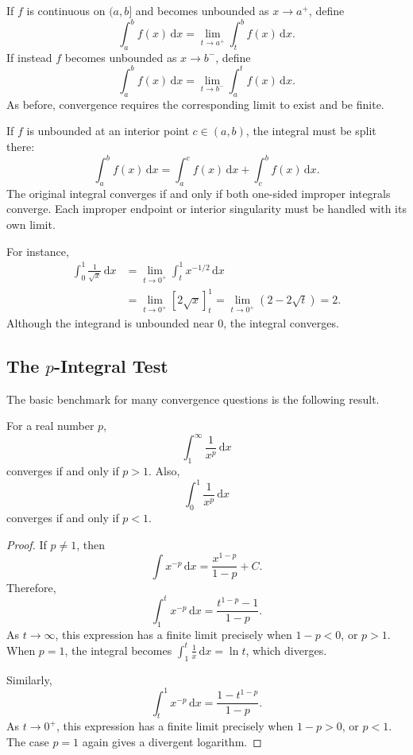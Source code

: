 If \(f\) is continuous on \((a,b]\) and becomes unbounded as
\(x\to a^+\), define
\[
    \int_a^b f(x)\,\mathrm{d}x
    =\lim_{t\to a^+}\int_t^b f(x)\,\mathrm{d}x.
\]
If instead \(f\) becomes unbounded as \(x\to b^-\), define
\[
    \int_a^b f(x)\,\mathrm{d}x
    =\lim_{t\to b^-}\int_a^t f(x)\,\mathrm{d}x.
\]
As before, convergence requires the corresponding limit to exist and be
finite.

If \(f\) is unbounded at an interior point \(c\in(a,b)\), the integral must
be split there:
\[
    \int_a^b f(x)\,\mathrm{d}x
    =\int_a^c f(x)\,\mathrm{d}x
     +\int_c^b f(x)\,\mathrm{d}x.
\]
The original integral converges if and only if both one-sided improper
integrals converge.  Each improper endpoint or interior singularity must be
handled with its own limit.

For instance,
\begin{align*}
    \int_0^1\frac{1}{\sqrt{x}}\,\mathrm{d}x
    &=\lim_{t\to0^+}\int_t^1x^{-1/2}\,\mathrm{d}x \\
    &=\lim_{t\to0^+}\left[2\sqrt{x}\right]_t^1
      =\lim_{t\to0^+}(2-2\sqrt{t})=2.
\end{align*}
Although the integrand is unbounded near \(0\), the integral converges.

\subsection{The \texorpdfstring{\(p\)}{p}-Integral Test}

The basic benchmark for many convergence questions is the following result.

\begin{theorem}
    For a real number \(p\),
    \[
        \int_1^\infty\frac{1}{x^p}\,\mathrm{d}x
    \]
    converges if and only if \(p>1\).  Also,
    \[
        \int_0^1\frac{1}{x^p}\,\mathrm{d}x
    \]
    converges if and only if \(p<1\).
\end{theorem}
\begin{proof}
    If \(p\neq1\), then
    \[
        \int x^{-p}\,\mathrm{d}x=\frac{x^{1-p}}{1-p}+C.
    \]
    Therefore,
    \[
        \int_1^t x^{-p}\,\mathrm{d}x
        =\frac{t^{1-p}-1}{1-p}.
    \]
    As \(t\to\infty\), this expression has a finite limit precisely when
    \(1-p<0\), or \(p>1\).  When \(p=1\), the integral becomes
    \(\int_1^t\frac1x\,\mathrm{d}x=\ln t\), which diverges.

    Similarly,
    \[
        \int_t^1 x^{-p}\,\mathrm{d}x
        =\frac{1-t^{1-p}}{1-p}.
    \]
    As \(t\to0^+\), this expression has a finite limit precisely when
    \(1-p>0\), or \(p<1\).  The case \(p=1\) again gives a divergent
    logarithm.
\end{proof}

